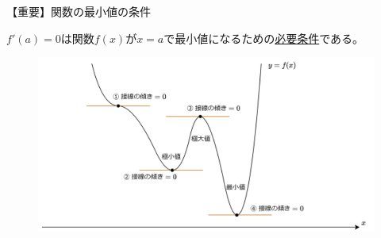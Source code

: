 \documentclass[dvipdfmx,aspectratio=169]{beamer}
\begin{document}
	\begin{frame}{【重要】関数の最小値の条件}
		\begin{screen}
			$ f'(a)=0 $は関数$ f(x) $が$ x=a $で最小値になるための\underline{必要条件}である。
		\end{screen}
		\begin{figure}
			\centering
			\includegraphics[width=0.7\linewidth]{img/necessary-condition-for-the-function-to-be-minimal}
		\end{figure}
	\end{frame}
	
\end{document}
